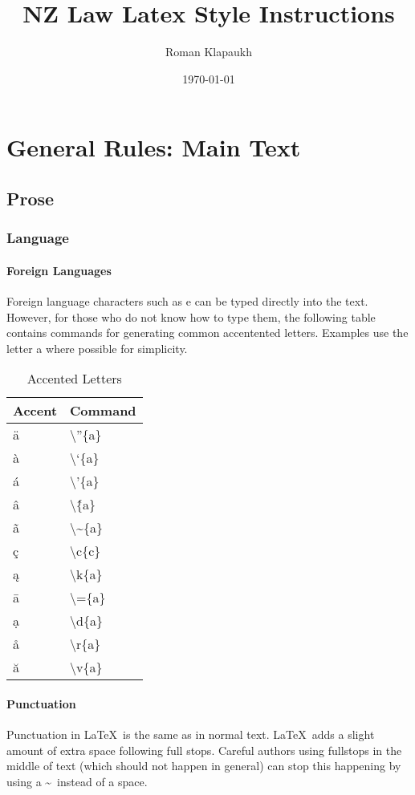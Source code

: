 \documentclass{nzlaw}
\newcommand{\s}{\textbackslash}
\newcommand{\latex}{\LaTeX}
\begin{document}
\title{NZ Law Latex Style Instructions}
\author{Roman Klapaukh}
\date{\today}

\maketitle

\section{General Rules: Main Text}
\subsection{Prose}
\subsubsection{Language}

\paragraph{Foreign Languages}
Foreign language characters such as \:e can be typed directly into the  text. However, for those who do not know how to type them, the following table contains commands for generating common accentented letters. Examples use the letter a where possible for simplicity.

\begin{table}[H]
\centering
\begin{tabular}{|l|l|}
\hline
Accent & Command \\ \hline
\"{a} & \s''\{a\} \\
\`{a} & \s`\{a\} \\
\'{a} & \s'\{a\} \\
\^{a} & \s\^\{a\}\\
\~{a} & \s\textasciitilde\{a\}\\
\c{c} & {\s}c\{c\}\\
\k{a} & {\s}k\{a\}\\
\={a} & \s=\{a\}\\
\d{a} & {\s}d\{a\}\\
\r{a} & {\s}r\{a\}\\
\u{a} & {\s}v\{a\}\\
\hline
\end{tabular}
\caption{Accented Letters}
\end{table}

\paragraph{Punctuation}
Punctuation in \latex~is the same as in normal text. \latex~adds a slight amount of extra space following full stops. Careful authors using fullstops in the middle of text (which should not happen in general) can stop this happening by using a \textasciitilde~instead of a space.
\end{document}
